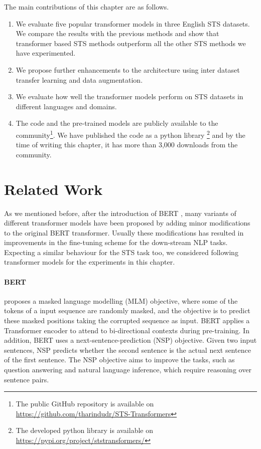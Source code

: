 The main contributions of this chapter are as follows.

\begin{enumerate}
\item We evaluate five popular transformer models in three English STS datasets. We compare the results with the previous methods and show that transformer based STS methods outperform all the other STS methods we have experimented.

\item We propose further enhancements to the architecture using inter dataset transfer learning and data augmentation.  

\item We evaluate how well the transformer models perform on STS datasets in different languages and domains. 

\item The code and the pre-trained models are publicly available to the community\footnote{The public GitHub repository is available on \url{https://github.com/tharindudr/STS-Transformers}}. We have published the code as a python library \footnote{The developed python library is available on \url{https://pypi.org/project/ststransformers/}} and by the time of writing this chapter, it has more than 3,000 downloads from the community. 

\end{enumerate}

\section{Related Work}
As we mentioned before, after the introduction of BERT \cite{devlin-etal-2019-bert}, many variants of different transformer models have been proposed by adding minor modifications to the original BERT transformer. Usually these modifications has resulted in improvements in the fine-tuning scheme for the down-stream NLP tasks. Expecting a similar behaviour for the STS task too, we considered following transformer models for the experiments in this chapter.

\paragraph{BERT} \cite{devlin-etal-2019-bert} proposes a masked language modelling (MLM) objective, where some of the tokens of a input sequence are randomly masked, and the objective is to predict these masked positions taking the corrupted sequence as input. BERT applies a Transformer encoder to attend to bi-directional contexts during pre-training. In addition, BERT uses a next-sentence-prediction (NSP) objective. Given two input sentences, NSP predicts whether the second sentence is the actual next sentence of the first sentence. The NSP objective aims to improve the tasks, such as question answering and natural language inference, which require reasoning over sentence pairs. 

